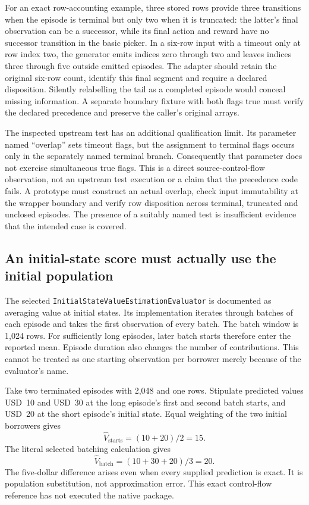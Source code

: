 For an exact row-accounting example, three stored rows provide three
transitions when the episode is terminal but only two when it is truncated:
the latter's final observation can be a successor, while its final action and
reward have no successor transition in the basic picker. In a six-row input
with a timeout only at row index two, the generator emits indices zero through
two and leaves indices three through five outside emitted episodes. The
adapter should retain the original six-row count, identify this final segment
and require a declared disposition. Silently relabelling the tail as a
completed episode would conceal missing information. A separate boundary
fixture with both flags true must verify the declared precedence and preserve
the caller's original arrays. \citep{exec15_d3rlpy_exact,exec15_d3rlpy_contract}

The inspected upstream test has an additional qualification limit. Its
parameter named ``overlap'' sets timeout flags, but the assignment to terminal
flags occurs only in the separately named terminal branch. Consequently that
parameter does not exercise simultaneous true flags. This is a direct
source-control-flow observation, not an upstream test execution or a claim
that the precedence code fails. A prototype must construct an actual overlap,
check input immutability at the wrapper boundary and verify row disposition
across terminal, truncated and unclosed episodes. The presence of a suitably
named test is insufficient evidence that the intended case is covered.
\citep{exec15_d3rlpy_episode,exec15_d3rlpy_contract}

\subsection{An initial-state score must actually use the initial population}

The selected \texttt{InitialStateValueEstimationEvaluator} is documented as
averaging value at initial states. Its implementation iterates through batches
of each episode and takes the first observation of every batch. The batch
window is 1,024 rows. For sufficiently long episodes, later batch starts
therefore enter the reported mean. Episode duration also changes the number
of contributions. This cannot be treated as one starting observation per
borrower merely because of the evaluator's name.
\citep{exec15_d3rlpy_value}

Take two terminated episodes with 2,048 and one rows. Stipulate predicted
values USD~10 and USD~30 at the long episode's first and second batch starts,
and USD~20 at the short episode's initial state. Equal weighting of the two
initial borrowers gives
\[
   \widehat V_{\mathrm{starts}}=(10+20)/2=15.
\]
The literal selected batching calculation gives
\[
   \widehat V_{\mathrm{batch}}=(10+30+20)/3=20.
\]
The five-dollar difference arises even when every supplied prediction is
exact. It is population substitution, not approximation error. This exact
control-flow reference has not executed the native package.
\citep{exec15_d3rlpy_exact}

